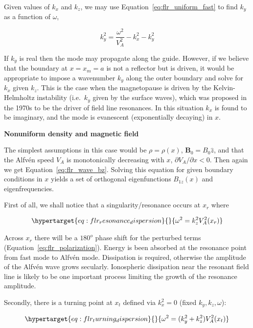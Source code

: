 \documentclass[
  notoc %
]{tufte-book}
\begin{document}
Given values of \(k_x\) and \(k_z\), we may use
Equation~\ref{eq:flr_uniform_fast} to find \(k_y\) as a function of
\(\omega\),

\[
k_y^2 = \frac{\omega^2}{V_A^2} - k_x^2 - k_y^2
\]

If \(k_y\) is real then the mode may propagate along the guide. However,
if we believe that the boundary at \(x = x_m = a\) is not a reflector
but is driven, it would be appropriate to impose a wavenumber \(k_y\)
along the outer boundary and solve for \(k_x\) given \(k_z\). This is
the case when the magnetopause is driven by the Kelvin-Helmholtz
instability (i.e.~\(k_y\) given by the surface waves), which was
proposed in the 1970s to be the driver of field line resonances. In this
situation \(k_x\) is found to be imaginary, and the mode is evanescent
(exponentially decaying) in \(x\).

\textbf{Nonuniform density and magnetic field}

The simplest assumptions in this case would be \(\rho = \rho(x)\),
\(\mathbf{B}_0 = B_0\hat{z}\), and that the Alfvén speed \(V_A\) is
monotonically decreasing with \(x\), \(\partial V_A / \partial x < 0\).
Then again we get Equation~\ref{eq:flr_wave_bz}. Solving this equation
for given boundary conditions in \(x\) yields a set of orthogonal
eigenfunctions \(B_{1z}(x)\) and eigenfrequencies.

First of all, we shall notice that a singularity/resonance occurs at
\(x_r\) where

\begin{equation}\protect\hypertarget{eq:flr_resonance_dispersion}{}{
\omega^2 = k_z^2 V_A^2(x_r)
}\label{eq:flr_resonance_dispersion}\end{equation}

Across \(x_r\) there will be a \(180^o\) phase shift for the perturbed
terms (Equation~\ref{eq:flr_polarization}). Energy is been absorbed at
the resonance point from fast mode to Alfvén mode. Dissipation is
required, otherwise the amplitude of the Alfvén wave grows secularly.
Ionospheric dissipation near the resonant field line is likely to be one
important process limiting the growth of the resonance amplitude.

Secondly, there is a turning point at \(x_t\) defined via \(k_x^2 = 0\)
(fixed \(k_y, k_z, \omega\)):

\begin{equation}\protect\hypertarget{eq:flr_turning_dispersion}{}{
\omega^2 = (k_y^2 + k_z^2)V_A^2(x_t)
}\label{eq:flr_turning_dispersion}\end{equation}
\end{document}
